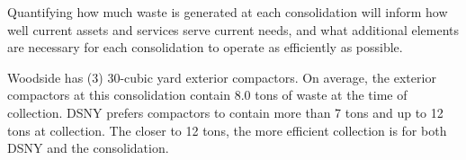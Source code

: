 
    Quantifying how much waste is generated at each consolidation will inform how well current assets and services serve current needs, and what additional elements are necessary for each consolidation to operate as efficiently as possible.
    
    Woodside has (3) 30-cubic yard exterior compactors. On average, the exterior compactors at this consolidation contain 8.0 tons of waste at the time of collection. DSNY prefers compactors to contain more than 7 tons and up to 12 tons at collection. The closer to 12 tons, the more efficient collection is for both DSNY and the consolidation.